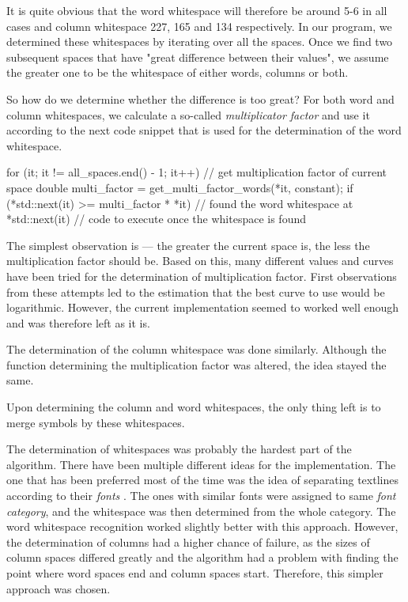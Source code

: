 \begin{description}

It is quite obvious that the word whitespace will therefore be around 5-6 in all cases and column whitespace 227, 165 and 134 respectively. In our program, we determined these whitespaces by iterating over all the spaces. Once we find two subsequent spaces that have "great difference between their values", we assume the greater one to be the whitespace of either words, columns or both.

So how do we determine whether the difference is too great? For both word and column whitespaces, we calculate a so-called \emph{multiplicator factor} and use it according to the next code snippet that is used for the determination of the word whitespace.

\begin{code}
for (it; it != all_spaces.end() - 1; it++)
{
	// get multiplication factor of current space
	double multi_factor = get_multi_factor_words(*it, constant);
	if (*std::next(it) >= multi_factor * *it)
	{
		// found the word whitespace at *std::next(it)
		// code to execute once the whitespace is found
	}
}
\end{code}

The simplest observation is --- the greater the current space is, the less the multiplication factor should be. Based on this, many different values and curves have been tried for the determination of multiplication factor. First observations from these attempts led to the estimation that the best curve to use would be logarithmic. However, the current implementation seemed to worked well enough and was therefore left as it is.

The determination of the column whitespace was done similarly. Although the function determining the multiplication factor was altered, the idea stayed the same.

Upon determining the column and word whitespaces, the only thing left is to merge symbols by these whitespaces.

The determination of whitespaces was probably the hardest part of the algorithm. There have been multiple different ideas for the implementation. The one that has been preferred most of the time was the idea of separating textlines according to their \emph{fonts} . The ones with similar fonts were assigned to same \emph{font category}, and the whitespace was then determined from the whole category. The word whitespace recognition worked slightly better with this approach. However, the determination of columns had a higher chance of failure, as the sizes of column spaces differed greatly and the algorithm had a problem with finding the point where word spaces end and column spaces start. Therefore, this simpler approach was chosen.


\end{description}
